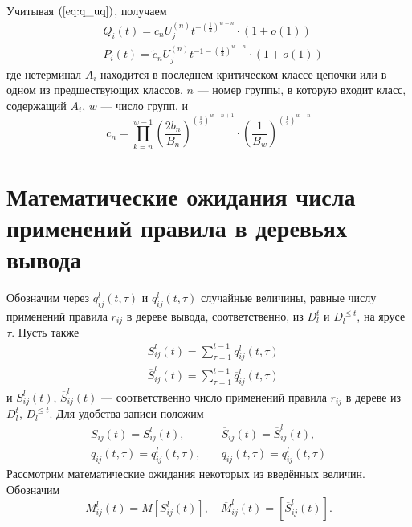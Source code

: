 \documentclass[12pt]{article}
\renewcommand{\leq}{\leqslant}
\begin{document}
{Учитывая $(\ref{eq:q_uq})$, получаем
\begin{equation*}
	\begin{split}
		&Q_i(t) = c_n U^{(n)}_j t^{-\left(\frac{1}{2}\right)^{w-n}} \cdot (1 + o(1)) \\
		&P_i(t) = \tilde{c}_n U^{(n)}_j t^{-1 -\left(\frac{1}{2}\right)^{w-n}} \cdot (1 + o(1))
	\end{split}
\end{equation*}
где нетерминал $A_i$ находится в последнем критическом классе цепочки или в одном из предшествующих классов, $n$ --- номер группы, в которую входит класс, содержащий $A_i$, $w$ --- число групп, и
\begin{equation*}
	c_n = \prod_{k = n}^{w - 1} \left(\frac{2 b_n}{B_n}\right)^{\left(\frac{1}{2}\right)^{w - n + 1}} \cdot \left(\frac{1}{B_w}\right)^{\left(\frac{1}{2}\right)^{w - n}}
\end{equation*}

\section{Математические ожидания числа применений правила в деревьях вывода}

Обозначим через $q^l_{ij}(t,\tau)$ и $\overline{q}^l_{ij}(t,\tau)$ случайные величины, равные числу применений правила $r_{ij}$ в дереве вывода, соответственно, из $D^t_l$ и $D^{\leq t}_l$, на ярусе $\tau$. Пусть также
\begin{equation*}
	\begin{split}
		&S^l_{ij}(t) = \sum_{\tau = 1}^{t-1} q^l_{ij}(t, \tau) \\
		&\overline{S}^l_{ij}(t) = \sum_{\tau = 1}^{t-1} \overline{q}^l_{ij}(t, \tau)
	\end{split}
\end{equation*}
и $S^l_{ij}(t)$, $\overline{S}^l_{ij}(t)$ --- соответственно число применений правила $r_{ij}$ в дереве из $D^t_l$, $D^{\leq t}_l$. Для удобства записи положим
\begin{align*}
	S_{ij}(t) = S^l_{ij}(t),\quad &\overline{S}_{ij}(t) = \overline{S}^l_{ij}(t), \\
	q_{ij}(t, \tau) = q^l_{ij}(t, \tau),\quad &\overline{q}_{ij}(t, \tau) = \overline{q}^l_{ij}(t, \tau)
\end{align*}
Рассмотрим математические ожидания некоторых из введённых величин. Обозначим
\begin{equation*}
	M^l_{ij}(t) = M[S^l_{ij}(t)],\quad \overline{M}^l_{ij}(t) = [\overline{S}^l_{ij}(t)].
\end{equation*}

}
\end{document}
